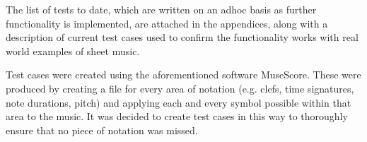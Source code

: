 The list of tests to date, which are written on an adhoc basis as further functionality is implemented, are attached in the appendices, along with a description of current test cases used to confirm the functionality works with real world examples of sheet music. 

Test cases were created using the aforementioned software MuseScore. These were produced by creating a file for every area of notation (e.g. clefs, time signatures, note durations, pitch) and applying each and every symbol possible within that area to the music. It was decided to create test cases in this way to thoroughly ensure that no piece of notation was missed.